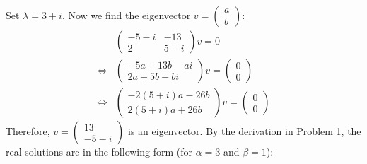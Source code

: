\documentclass[12pt,letterpaper]{article}
\begin{document}
\begin{enumerate}[label=(\alph*)]
	      Set $\lambda = 3 + i$.
	      Now we find the eigenvector $v = \begin{pmatrix}
			      a \\
			      b
		      \end{pmatrix}$:
	      \begin{align}
		                      & \begin{pmatrix}
			      -5 - i & -13   \\
			      2      & 5 - i
		      \end{pmatrix}v   = 0                          \\
		      \Leftrightarrow & \begin{pmatrix}
			      -5a - 13b -ai \\
			      2a + 5b - bi
		      \end{pmatrix} v  =\begin{pmatrix}
			      0 \\
			      0
		      \end{pmatrix} \\
		      \Leftrightarrow & \begin{pmatrix}
			      -2(5 + i)a - 26b \\
			      2(5 + i)a + 26b
		      \end{pmatrix} v  =\begin{pmatrix}
			      0 \\
			      0
		      \end{pmatrix}
	      \end{align}
	      Therefore, $v= \begin{pmatrix}
			      13     \\
			      -5 - i
		      \end{pmatrix}$ is an eigenvector.
	      By the derivation in Problem 1, the real solutions are in the following form (for $\alpha = 3$ and $\beta = 1$):


\end{enumerate}
\end{document}
